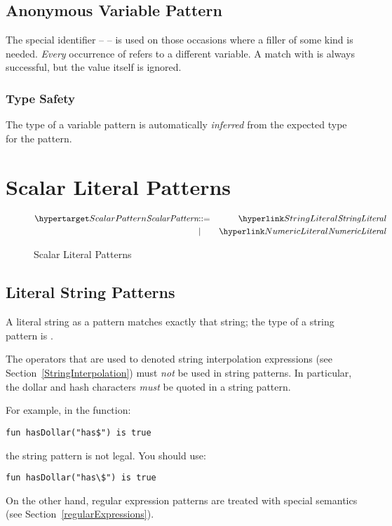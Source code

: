 \subsection{Anonymous Variable Pattern}
\label{anonymousVariable}
The special identifier -- \q{\_} -- is used on those occasions where a filler of some kind is needed. \emph{Every} occurrence of \q{\_} refers to a different variable. A match with \q{\_} is always successful, but the value itself is ignored.

\subsubsection{Type Safety}
The type of a variable pattern is automatically \emph{inferred} from the expected type for the pattern.

\section{Scalar Literal Patterns}
\label{scalarPatterns}

\begin{figure}[htbp]
\begin{eqnarray*}
\ntDef{ScalarPattern}&\arrow&\ntRef{StringLiteral}\\
&\choice&\ntRef{NumericLiteral}
\end{eqnarray*}
\caption{Scalar Literal Patterns}
\label{scalarLiteralPtnFig}
\end{figure}


\subsection{Literal String Patterns}
\label{literalStringPattern}

A literal string as a pattern matches exactly that string; the type of a string pattern is .

\begin{aside}
The operators that are used to denoted string interpolation expressions (see Section~\vref{StringInterpolation}) must \emph{not} be used in string patterns. In particular, the dollar and hash characters \emph{must} be quoted in a string pattern.

For example, in the function:
\begin{lstlisting}
fun hasDollar("has$") is true
\end{lstlisting}
the string pattern  is not legal. You should use:
\begin{lstlisting}
fun hasDollar("has\$") is true
\end{lstlisting}

On the other hand, regular expression patterns are treated with special semantics (see Section~\vref{regularExpressions}).
\end{aside}

